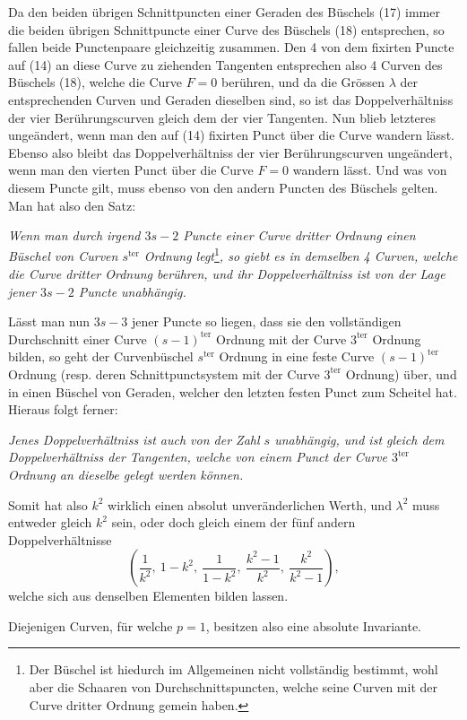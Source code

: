 \documentclass[10pt]{article}
\begin{document}
Da den beiden übrigen Schnittpuncten einer Geraden des Büschels (17) immer die beiden übrigen Schnittpuncte einer Curve des Büschels (18) entsprechen, so fallen beide Punctenpaare gleichzeitig zusammen. Den 4 von dem fixirten Puncte auf (14) an diese Curve zu ziehenden Tangenten entsprechen also 4 Curven des Büschels (18), welche die Curve \(F=0\) berühren, und da die Grössen \(\lambda\) der entsprechenden Curven und Geraden dieselben sind, so ist das Doppelverhältniss der vier Berührungscurven gleich dem der vier Tangenten. Nun blieb letzteres ungeändert, wenn man den auf (14) fixirten Punct über die Curve wandern lässt. Ebenso also bleibt das Doppelverhältniss der vier Berührungscurven ungeändert, wenn man den vierten Punct über die Curve \(F=0\) wandern lässt. Und was von diesem Puncte gilt, muss ebenso von den andern Puncten des Büschels gelten. Man hat also den Satz:

\emph{Wenn man durch irgend \(3s-2\) Puncte einer Curve dritter Ordnung einen Büschel von Curven \(s^{\text{ter}}\) Ordnung legt}\footnote{Der Büschel ist hiedurch im Allgemeinen nicht vollständig bestimmt, wohl aber die Schaaren von Durchschnittspuncten, welche seine Curven mit der Curve dritter Ordnung gemein haben.}\emph{, so giebt es in demselben 4 Curven, welche die Curve dritter Ordnung berühren, und ihr Doppelverhältniss ist von der Lage jener \(3s-2\) Puncte unabhängig.}

Lässt man nun \(3s-3\) jener Puncte so liegen, dass sie den vollständigen Durchschnitt einer Curve \((s-1)^{\text{ter}}\) Ordnung mit der Curve \(3^{\text{ter}}\) Ordnung bilden, so geht der Curvenbüschel \(s^{\text{ter}}\) Ordnung in eine feste Curve \((s-1)^{\text{ter}}\) Ordnung (resp. deren Schnittpunctsystem mit der Curve \(3^{\text{ter}}\) Ordnung) über, und in einen Büschel von Geraden, welcher den letzten festen Punct zum Scheitel hat. Hieraus folgt ferner:

\emph{Jenes Doppelverhältniss ist auch von der Zahl \(s\) unabhängig, und ist gleich dem Doppelverhältniss der Tangenten, welche von einem Punct der Curve \(3^{\text{ter}}\) Ordnung an dieselbe gelegt werden können.}

Somit hat also \(k^2\) wirklich einen absolut unveränderlichen Werth, und \(\lambda^2\) muss entweder gleich \(k^2\) sein, oder doch gleich einem der fünf andern Doppelverhältnisse
\[
\left(\frac1{k^2},\ 1-k^2,\ \frac1{1-k^2},\ \frac{k^2-1}{k^2},\ \frac{k^2}{k^2-1}\right),
\]
welche sich aus denselben Elementen bilden lassen.

Diejenigen Curven, für welche \(p=1\), besitzen also eine absolute Invariante.
\end{document}
